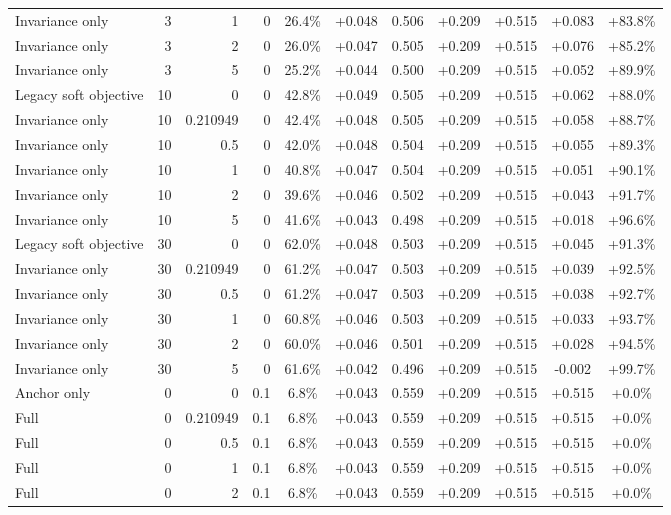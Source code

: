 \begin{table}[htbp]
\begin{tabular}{lrrrccccccc}
Invariance only & 3 & 1 & 0 & 26.4\% & +0.048 & 0.506 & +0.209 & +0.515 & +0.083 & +83.8\% \\
Invariance only & 3 & 2 & 0 & 26.0\% & +0.047 & 0.505 & +0.209 & +0.515 & +0.076 & +85.2\% \\
Invariance only & 3 & 5 & 0 & 25.2\% & +0.044 & 0.500 & +0.209 & +0.515 & +0.052 & +89.9\% \\
Legacy soft objective & 10 & 0 & 0 & 42.8\% & +0.049 & 0.505 & +0.209 & +0.515 & +0.062 & +88.0\% \\
Invariance only & 10 & 0.210949 & 0 & 42.4\% & +0.048 & 0.505 & +0.209 & +0.515 & +0.058 & +88.7\% \\
Invariance only & 10 & 0.5 & 0 & 42.0\% & +0.048 & 0.504 & +0.209 & +0.515 & +0.055 & +89.3\% \\
Invariance only & 10 & 1 & 0 & 40.8\% & +0.047 & 0.504 & +0.209 & +0.515 & +0.051 & +90.1\% \\
Invariance only & 10 & 2 & 0 & 39.6\% & +0.046 & 0.502 & +0.209 & +0.515 & +0.043 & +91.7\% \\
Invariance only & 10 & 5 & 0 & 41.6\% & +0.043 & 0.498 & +0.209 & +0.515 & +0.018 & +96.6\% \\
Legacy soft objective & 30 & 0 & 0 & 62.0\% & +0.048 & 0.503 & +0.209 & +0.515 & +0.045 & +91.3\% \\
Invariance only & 30 & 0.210949 & 0 & 61.2\% & +0.047 & 0.503 & +0.209 & +0.515 & +0.039 & +92.5\% \\
Invariance only & 30 & 0.5 & 0 & 61.2\% & +0.047 & 0.503 & +0.209 & +0.515 & +0.038 & +92.7\% \\
Invariance only & 30 & 1 & 0 & 60.8\% & +0.046 & 0.503 & +0.209 & +0.515 & +0.033 & +93.7\% \\
Invariance only & 30 & 2 & 0 & 60.0\% & +0.046 & 0.501 & +0.209 & +0.515 & +0.028 & +94.5\% \\
Invariance only & 30 & 5 & 0 & 61.6\% & +0.042 & 0.496 & +0.209 & +0.515 & -0.002 & +99.7\% \\
Anchor only & 0 & 0 & 0.1 & 6.8\% & +0.043 & 0.559 & +0.209 & +0.515 & +0.515 & +0.0\% \\
Full & 0 & 0.210949 & 0.1 & 6.8\% & +0.043 & 0.559 & +0.209 & +0.515 & +0.515 & +0.0\% \\
Full & 0 & 0.5 & 0.1 & 6.8\% & +0.043 & 0.559 & +0.209 & +0.515 & +0.515 & +0.0\% \\
Full & 0 & 1 & 0.1 & 6.8\% & +0.043 & 0.559 & +0.209 & +0.515 & +0.515 & +0.0\% \\
Full & 0 & 2 & 0.1 & 6.8\% & +0.043 & 0.559 & +0.209 & +0.515 & +0.515 & +0.0\% \\

\end{tabular}
\end{table}
